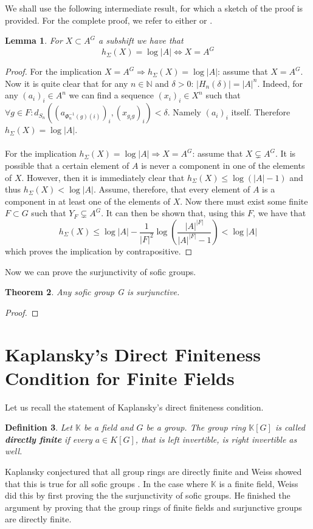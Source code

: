 \documentclass[titlepage, a4paper]{article}
\newcommand{\N}{\mathbb{N}}
\newtheorem{theorem}{Theorem}[section]
\newtheorem{definition}[theorem]{Definition}
\newtheorem{lemma}[theorem]{Lemma}
\theoremstyle{remark}
\begin{document}
We shall use the following intermediate result, for which a sketch of the proof is provided. For the complete proof, we refer to either \cite[paragraph 2.13.7]{capraro_lupini_2015} or \cite[theorem 4.12]{kerr_li_2010}.

\begin{lemma}
For $X \subset A^G$ a subshift we have that 
		\[
		h_\Sigma(X) = \log |A| \Leftrightarrow X = A^G
		\]
\end{lemma}
\begin{proof}
For the implication $X = A^G \Rightarrow h_\Sigma(X) = \log |A|$: assume that $X = A^G$. Now it is quite clear that for any $n \in \N$ and $\delta > 0$: $|H_n(\delta)| = |A|^n$. Indeed, for any $(a_i)_i \in A^n$ we can find a sequence $(x_i)_i \in X^n$ such that $\forall g \in F: d_{S_n}((a_{\Phi^{-1}_n(g)(i)})_i,(x_{g_i g})_i) < \delta$. Namely  $(a_i)_i$ itself. Therefore $h_\Sigma(X) = \log |A|$.\\
\\
For the implication $h_\Sigma(X) = \log |A| \Rightarrow X = A^G$: assume that $X \varsubsetneq A^G$. It is possible that a certain element of $A$ is never a component in one of the elements of $X$. However, then it is immediately clear that $h_\Sigma(X) \leq \log (|A|-1) $ and thus $h_\Sigma(X) < \log |A|$. Assume, therefore, that every element of $A$ is a component in at least one of the elements of $X$. Now there must exist some finite $F \subset G$ such that $Y_F \varsubsetneq A^G$. It can then be shown that, using this $F$, we have that
		\[
		h_\Sigma(X) \leq \log |A| - \frac{1}{|F|^2} \log \left(\frac{|A|^{|F|}}{|A|^{|F|} - 1}\right) < \log |A|
		\]
which proves the implication by contrapositive. 
\end{proof}

Now we can prove the surjunctivity of sofic groups.

\begin{theorem}
Any sofic group G is surjunctive.
\end{theorem}
\begin{proof}

\end{proof}

	\section{Kaplansky's Direct Finiteness Condition for Finite Fields}
	Let us recall the statement of Kaplansky's direct finiteness condition.
	\begin{definition}
		Let $\mathbb K$ be a field and $G$ be a group. The group ring $\mathbb K[G]$ is called \textbf{directly finite} if every  $a \in K[G]$, that is left invertible, is right invertible as well. 
		
	\end{definition}
	Kaplansky conjectured that all group rings are directly finite and Weiss showed that this is true for all sofic groups \cite[section 3, section 4]{weiss_2000}. 
	In the case where $\mathbb K$ is a finite field, Weiss did this by first proving the the surjunctivity of sofic groups.
	He finished the argument by proving that the group rings of finite fields and surjunctive groups are directly finite.  
\end{document}
